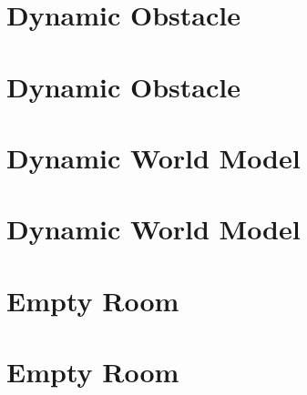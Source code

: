 \documentclass[twoside]{book}
\newcommand{\+}{\discretionary{\mbox{\scriptsize$\hookleftarrow$}}{}{}}
\begin{document}
\chapter{Dynamic Obstacle}
\label{md_smacc2_sm_reference_library_sm_dance_bot_warehouse_2_models_dynamic_obstacle_copy_README}

\chapter{Dynamic Obstacle}
\label{md_smacc2_sm_reference_library_sm_dance_bot_warehouse_2_models_dynamic_obstacle_README}

\chapter{Dynamic World Model}
\label{md_smacc2_sm_reference_library_sm_dance_bot_warehouse_2_models_dynamic_world_copy_README}

\chapter{Dynamic World Model}
\label{md_smacc2_sm_reference_library_sm_dance_bot_warehouse_2_models_dynamic_world_README}

\chapter{Empty Room}
\label{md_smacc2_sm_reference_library_sm_dance_bot_warehouse_2_models_empty_room_copy_README}

\chapter{Empty Room}
\label{md_smacc2_sm_reference_library_sm_dance_bot_warehouse_2_models_empty_room_README}

\end{document}

